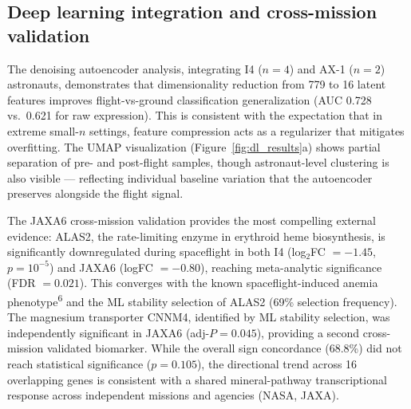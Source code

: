 \documentclass[11pt,a4paper]{article}
\begin{document}
\subsection{Deep learning integration and cross-mission validation}

The denoising autoencoder analysis, integrating I4 ($n = 4$) and AX-1 ($n = 2$) astronauts, demonstrates that dimensionality reduction from 779 to 16 latent features improves flight-vs-ground classification generalization (AUC 0.728 vs.\ 0.621 for raw expression). This is consistent with the expectation that in extreme small-$n$ settings, feature compression acts as a regularizer that mitigates overfitting. The UMAP visualization (Figure~\ref{fig:dl_results}a) shows partial separation of pre- and post-flight samples, though astronaut-level clustering is also visible --- reflecting individual baseline variation that the autoencoder preserves alongside the flight signal.

The JAXA6 cross-mission validation provides the most compelling external evidence: ALAS2, the rate-limiting enzyme in erythroid heme biosynthesis, is significantly downregulated during spaceflight in both I4 (log$_2$FC $= -1.45$, $p = 10^{-5}$) and JAXA6 (logFC $= -0.80$), reaching meta-analytic significance (FDR $= 0.021$). This converges with the known spaceflight-induced anemia phenotype\textsuperscript{6} and the ML stability selection of ALAS2 (69\% selection frequency). The magnesium transporter CNNM4, identified by ML stability selection, was independently significant in JAXA6 (adj-$P = 0.045$), providing a second cross-mission validated biomarker. While the overall sign concordance (68.8\%) did not reach statistical significance ($p = 0.105$), the directional trend across 16 overlapping genes is consistent with a shared mineral-pathway transcriptional response across independent missions and agencies (NASA, JAXA).
\end{document}
